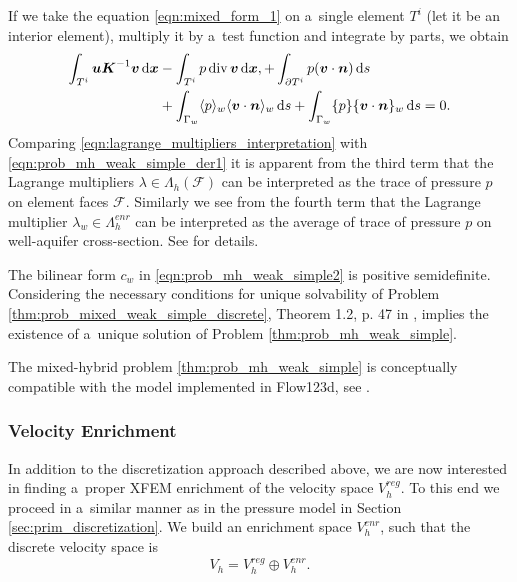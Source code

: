 If we take the equation \eqref{eqn:mixed_form_1} on a~single element $T^i$ (let it be an interior element),
multiply it by a~test function and integrate by parts, we obtain
\begin{align} \label{eqn:lagrange_multipliers_interpretation}
    \int_{T^i} \mathbf{\boldsymbol{u}} \mathbf{\boldsymbol{K}}^{-1} \mathbf{\boldsymbol{v}} \,{\rm d}\mathbf{\boldsymbol{x}}
    &- \int_{T^i} p\,{\rm div}\,\mathbf{\boldsymbol{v}} \,{\rm d}\mathbf{\boldsymbol{x}},
    + \int_{\partial T^i} p (\mathbf{\boldsymbol{v}} \cdot \mathbf{\boldsymbol{n}}) \,{\rm d} s \nonumber\\
    &+ \int_{\Gamma_w} \langle p\rangle_w \langle\mathbf{\boldsymbol{v}}\cdot\mathbf{\boldsymbol{n}}\rangle_w \,{\rm d} s
    + \int_{\Gamma_w} \{p\} \{\mathbf{\boldsymbol{v}} \cdot \mathbf{\boldsymbol{n}}\}_w \,{\rm d} s = 0.
\end{align}
Comparing \eqref{eqn:lagrange_multipliers_interpretation} with \eqref{eqn:prob_mh_weak_simple_der1}
it is apparent from the third term that the Lagrange multipliers $\lambda\in\Lambda_h(\mathcal{F})$ can be interpreted
as the trace of pressure $p$ on element faces $\mathcal F$.
Similarly we see from the fourth term that the Lagrange multiplier $\lambda_w\in\Lambda^{enr}_h$ can be interpreted as
the average of trace of pressure $p$ on well-aquifer cross-section.
See \cite{lawrence_balancing_1995} for details.

The bilinear form $c_w$ in \eqref{eqn:prob_mh_weak_simple2} is positive semidefinite.
Considering the necessary conditions for unique solvability of Problem \ref{thm:prob_mixed_weak_simple_discrete},
Theorem 1.2, p. 47 in \cite{brezzi_mixed_1991}, implies the existence of a~unique solution of Problem \ref{thm:prob_mh_weak_simple}.

The mixed-hybrid problem \ref{thm:prob_mh_weak_simple} is conceptually compatible
with the model implemented in Flow123d, see \cite{sistek_bddc_2015, flow123d}.


\subsubsection{Velocity Enrichment}
\label{sec:velocity_enrichment}

In addition to the discretization approach described above, we are now interested in finding
a~proper XFEM enrichment of the velocity space $V^{reg}_h$.
To this end we proceed in a~similar manner as in the pressure model in Section \ref{sec:prim_discretization}.
We build an enrichment space $V_h^{enr}$, such that the discrete velocity space is
\begin{equation}
    V_h = V_h^{reg} \oplus V_h^{enr}.
\end{equation}


